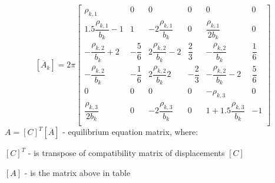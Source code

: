   \begin{equation}\label{eqn:eqMatrix}
    [\overline{A}_k]=2\pi
    \begin{bmatrix}
        \rho_{k,1} & 0 & 0 & 0 & 0 & 0 \\[2ex]
        1.5\dfrac{\rho_{k,1}}{b_k}-1 & 1 & -2\dfrac{\rho_{k,1}}{b_k} & 0 & \dfrac{\rho_{k,1}}{2b_k} & 0 \\[2ex]
        -\dfrac{\rho_{k,2}}{b_k}+2 & -\dfrac{5}{6} & 2\dfrac{\rho_{k,2}}{b_k}-2 & \dfrac{2}{3} & -\dfrac{\rho_{k,2}}{b_k} & \dfrac{1}{6} \\[2ex]
        -\dfrac{\rho_{k,2}}{b_k} & -\dfrac{1}{6} & 2\dfrac{\rho_{k,2}}{b_k}2 & -\dfrac{2}{3} & -\dfrac{\rho_{k,2}}{b_k}-2 & \dfrac{5}{6} \\[2ex]
        0 & 0 & 0 & 0 & -\rho_{k,3} & 0 \\[2ex]
        \dfrac{\rho_{k,3}}{2b_k} & 0 & -2\dfrac{\rho_{k,3}}{b_k} & 0 & 1+1.5\dfrac{\rho_{k,3}}{b_k} & -1 \\[2ex]
      \end{bmatrix}
  \end{equation}
$A=[C]^T[\overline{A}]$ - equilibrium equation matrix, where:\par
$[C]^T$ - is transpose of compatibility matrix of displacements $[C]$\par
$[A]$ - is the matrix above in table\par
{}